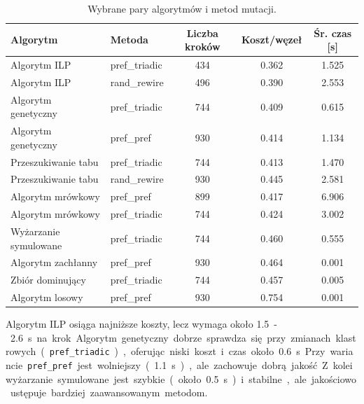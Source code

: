 \begin{table}[H]
    \centering
    \caption{Wybrane pary algorytmów i metod mutacji.}
    \label{tab:dyn-synth-selected-best}
    \begin{tabular}{llccc}
        \toprule
        \textbf{Algorytm}     & \textbf{Metoda} & \textbf{Liczba kroków} & \textbf{Koszt/węzeł} & \textbf{Śr. czas [s]} \\
        \midrule
        Algorytm ILP          & pref\_triadic   & 434                    & 0.362                & 1.525                 \\
        Algorytm ILP          & rand\_rewire    & 496                    & 0.390                & 2.553                 \\
        Algorytm genetyczny   & pref\_triadic   & 744                    & 0.409                & 0.615                 \\
        Algorytm genetyczny   & pref\_pref      & 930                    & 0.414                & 1.134                 \\
        Przeszukiwanie tabu   & pref\_triadic   & 744                    & 0.413                & 1.470                 \\
        Przeszukiwanie tabu   & rand\_rewire    & 930                    & 0.445                & 2.581                 \\
        Algorytm mrówkowy     & pref\_pref      & 899                    & 0.417                & 6.906                 \\
        Algorytm mrówkowy     & pref\_triadic   & 744                    & 0.424                & 3.002                 \\
        Wyżarzanie symulowane & pref\_triadic   & 744                    & 0.460                & 0.555                 \\
        Algorytm zachłanny    & pref\_pref      & 930                    & 0.464                & 0.001                 \\
        Zbiór dominujący      & pref\_triadic   & 744                    & 0.457                & 0.005                 \\
        Algorytm losowy       & pref\_pref      & 930                    & 0.754                & 0.001                 \\
        \bottomrule
    \end{tabular}
\end{table}

Algorytm ILP osiąga najniższe koszty, lecz wymaga około \SI{1.5}-\SI{2.6}{\second} na krok. Algorytm genetyczny dobrze sprawdza się przy zmianach klastrowych (\texttt{pref\_triadic}), oferując niski koszt i czas około \SI{0.6}{\second}. Przy wariancie \texttt{pref\_pref} jest wolniejszy (\SI{1.1}{\second}), ale zachowuje dobrą jakość. Z kolei wyżarzanie symulowane jest szybkie (około \SI{0.5}{\second}) i stabilne, ale jakościowo ustępuje bardziej zaawansowanym metodom.

